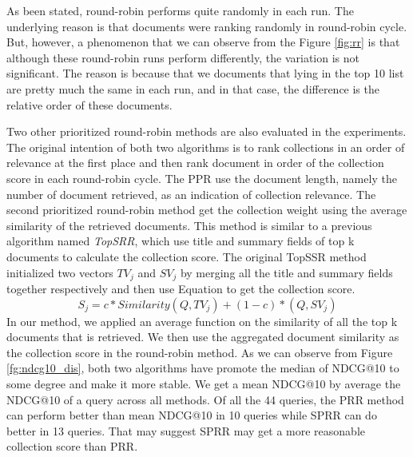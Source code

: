 As been stated, round-robin performs quite randomly in each run. The underlying reason is that documents were ranking  randomly in round-robin cycle. But, however, a phenomenon that we can observe from the Figure \ref{fig:rr} is that although these round-robin runs perform differently, the variation is not significant. The reason is because that we documents that lying in the top 10 list are pretty much the same in each run, and in that case, the difference is the relative order of these documents.    

Two other prioritized round-robin methods are also evaluated in the experiments. The original intention of both two algorithms is to rank collections in an order of relevance at the first place and then rank document in order of the collection score in each round-robin cycle. The PPR use the document length, namely the number of document retrieved, as an indication of collection relevance. The second prioritized round-robin method get the collection weight using the average similarity of the retrieved documents. This method is similar to a previous algorithm named \textit{TopSRR}\cite{Lu2005}, which use title and summary fields of top k documents to calculate the collection score. The original TopSSR method initialized two vectors $TV_j$ and $SV_j$ by merging all the title and summary fields together respectively and then use Equation to get the collection score.
\begin{equation}
S_j=c*Similarity(Q,TV_j)+(1-c)*(Q,SV_j)
\end{equation}   
In our method, we applied an average function on the similarity of all the top k documents that is retrieved. We then use the aggregated document similarity as the collection score in the round-robin method. As we can observe from Figure \ref{fg:ndcg10_dis}, both two algorithms have promote the median of NDCG@10 to some degree and make it more stable. We get a mean NDCG@10 by average the NDCG@10 of a query across all methods. Of all the 44 queries, the PRR method can perform better than mean NDCG@10 in 10 queries while SPRR can do better in 13 queries. That may suggest SPRR may get a more reasonable collection score than PRR.

